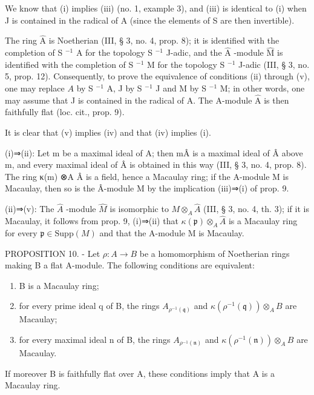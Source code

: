 We know that (i) implies (iii) (no. 1, example 3), and (iii) is identical to (i) when J is contained in the radical of A (since the elements of S are then invertible).

The ring \(\widehat{\mathrm{A}}\) is Noetherian (III, § 3, no. 4, prop. 8); it is identified with the completion of S \(^{-1}\) A for the topology S \(^{-1}\) J-adic, and the \(\widehat{\mathrm{A}}\) -module \(\widehat{\mathrm{M}}\) is identified with the completion of S \(^{-1}\) M for the topology S \(^{-1}\) J-adic (III, § 3, no. 5, prop. 12). Consequently, to prove the equivalence of conditions (ii) through (v), one may replace \(A\) by S \(^{-1}\) A, J by S \(^{-1}\) J and M by S \(^{-1}\) M; in other words, one may assume that J is contained in the radical of A. The A-module \(\widehat{\mathrm{A}}\) is then faithfully flat (loc. cit., prop. 9).

It is clear that (v) implies (iv) and that (iv) implies (i).

(i)⇒(ii): Let m be a maximal ideal of A; then mÂ is a maximal ideal of Â above m, and every maximal ideal of Â is obtained in this way (III, § 3, no. 4, prop. 8). The ring κ(m) ⊗A Â is a field, hence a Macaulay ring; if the A-module M is Macaulay, then so is the Â-module M by the implication (iii)⇒(i) of prop. 9.

(ii)⇒(v): The \(\hat{A}\) -module \(\hat{M}\) is isomorphic to \(M\otimes_{A}\hat{A}\) (III, § 3, no. 4, th. 3); if it is Macaulay, it follows from prop. 9, (i)⇒(ii) that \(\kappa(\mathfrak{p})\otimes_{A}\hat{A}\) is a Macaulay ring for every \(\mathfrak{p}\in\mathrm{Supp}(M)\) and that the A-module M is Macaulay.

PROPOSITION 10. - Let \(\rho: A \to B\) be a homomorphism of Noetherian rings making B a flat A-module. The following conditions are equivalent:

\begin{enumerate}
\def\labelenumi{(\roman{enumi})}
\item
  B is a Macaulay ring;
\item
  for every prime ideal q of B, the rings \(A_{\rho^{-1}(\mathfrak{q})}\) and \(\kappa(\rho^{-1}(\mathfrak{q}))\otimes_{A}B\) are Macaulay;
\item
  for every maximal ideal n of B, the rings \(A_{\rho^{-1}(\mathfrak{n})}\) and \(\kappa(\rho^{-1}(\mathfrak{n})) \otimes_{A} B\) are Macaulay.
\end{enumerate}

If moreover B is faithfully flat over A, these conditions imply that A is a Macaulay ring.

